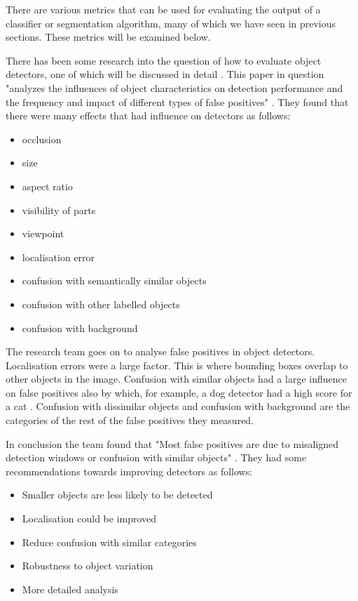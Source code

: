 There are various metrics that can be used for evaluating the output
of a classifier or segmentation algorithm, many of which we have seen in previous
sections. These metrics will be examined below.

There has been some research into the question of how to evaluate object
detectors, one of which will be discussed in detail \parencite{diagnosingErrors}.
This paper in question "analyzes the influences of object characteristics on
detection performance and the frequency and impact of different types of false
positives" \parencite{diagnosingErrors}. They found that there were many effects
that had influence on detectors as follows:
\begin{itemize}
    \item{occlusion}
    \item{size}
    \item{aspect ratio}
    \item{visibility of parts}
    \item{viewpoint}
    \item{localisation error}
    \item{confusion with semantically similar objects}
    \item{confusion with other labelled objects}
    \item{confusion with background}
\end{itemize}

The research team goes on to analyse false positives in object detectors.
Localisation errors were a large factor. This is where bounding boxes overlap to
other objects in the image. Confusion with similar objects had a large influence
on false positives also by which, for example, a dog detector had a high score
for a cat \parencite{diagnosingErrors}. Confusion with dissimilar objects and
confusion with background are the categories of the rest of the false positives
they measured.

In conclusion the team found that "Most false positives are due to misaligned
detection windows or confusion with similar objects"
\parencite{diagnosingErrors}. They had some recommendations towards improving
detectors as follows:
\begin{itemize}
	\item{Smaller objects are less likely to be detected}
	\item{Localisation could be improved}
	\item{Reduce confusion with similar categories}
	\item{Robustness to object variation}
	\item{More detailed analysis}
\end{itemize}

